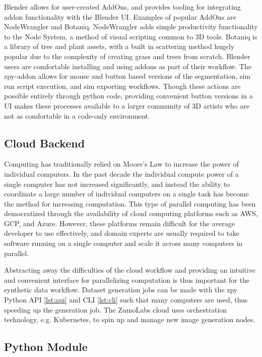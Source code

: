 \documentclass{article}
\begin{document}
Blender allows for user-created AddOns, and provides tooling for integrating addon functionality with the Blender UI. Examples of popular AddOns are NodeWrangler and Botaniq. NodeWrangler adds simple productivity functionality to the Node System, a method of visual scripting common to 3D tools. Botaniq is a library of tree and plant assets, with a built in scattering method hugely popular due to the complexity of creating grass and trees from scratch. Blender users are comfortable installing and using addons as part of their workflow. The zpy-addon allows for mouse and button based versions of the segmentation, sim run script execution, and sim exporting workflows. Though these actions are possible entirely through python code, providing convenient button versions in a UI makes these processes available to a larger community of 3D artists who are not as comfortable in a code-only environment.

\subsection{Cloud Backend}
\label{sec:cloudbackend}

Computing has traditionally relied on Moore’s Law to increase the power of individual computers. In the past decade the individual compute power of a single computer has not increased significantly, and instead the ability to coordinate a large number of individual computers on a single task has become the method for increasing computation. This type of parallel computing has been democratized through the availability of cloud computing platforms such as AWS, GCP, and Azure. However, these platforms remain difficult for the average developer to use effectively, and domain experts are usually required to take software running on a single computer and scale it across many computers in parallel.

Abstracting away the difficulties of the cloud workflow and providing an intuitive and convenient interface for parallelizing computation is thus important for the synthetic data workflow. Dataset generation jobs can be made with the zpy Python API \ref{lst:api} and CLI \ref{lst:cli} such that many computers are used, thus speeding up the generation job. The ZumoLabs cloud uses orchestration technology, e.g. Kubernetes, to spin up and manage new image generation nodes.

\subsection{Python Module}
\label{sec:pythonmodule}
\end{document}
